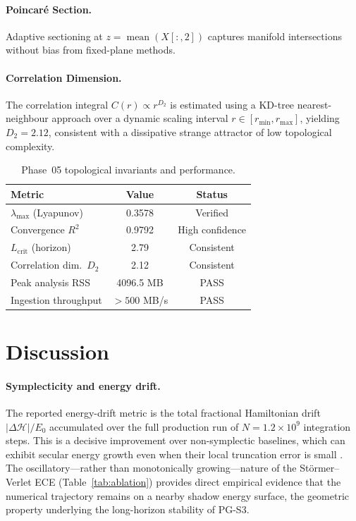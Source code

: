 \documentclass[10pt,twocolumn]{article}
\begin{document}
\paragraph{Poincar\'{e} Section.}
Adaptive sectioning at $z = \operatorname{mean}(X[:,2])$
captures manifold intersections without bias from
fixed-plane methods.

\paragraph{Correlation Dimension.}
The correlation integral $C(r)\propto r^{D_2}$ is estimated
using a KD-tree nearest-neighbour approach over a dynamic
scaling interval $r\in[r_{\min},r_{\max}]$,
yielding $D_2 = 2.12$, consistent with
a dissipative strange attractor of low topological complexity.

\begin{table}[h]
\centering
\caption{Phase~05 topological invariants and performance.}
\label{tab:phase05}
\small
\begin{tabular}{@{}lcc@{}}
\toprule
\textbf{Metric} & \textbf{Value} & \textbf{Status} \\
\midrule
$\lambda_{\max}$ (Lyapunov)    & 0.3578  & Verified \\
Convergence $R^2$              & 0.9792  & High confidence \\
$L_{\text{crit}}$ (horizon)    & 2.79    & Consistent \\
Correlation dim.\ $D_2$        & 2.12    & Consistent \\
Peak analysis RSS              & 4096.5 MB & PASS \\
Ingestion throughput           & $>500$ MB/s & PASS \\
\bottomrule
\end{tabular}
\end{table}

\section{Discussion}
\label{sec:discussion}

\paragraph{Symplecticity and energy drift.}
The reported energy-drift metric is the total fractional Hamiltonian drift
$|\Delta\mathcal{H}|/E_0$ accumulated over the full production run of
$N=1.2\times10^9$ integration steps.
This is a decisive improvement over non-symplectic baselines,
which can exhibit secular energy growth even when their local truncation
error is small \cite{hairer2006geometric}.
The oscillatory---rather than monotonically growing---nature of
the St\"{o}rmer--Verlet ECE (Table~\ref{tab:ablation}) provides
direct empirical evidence that the numerical trajectory remains on a nearby
shadow energy surface, the geometric property underlying the long-horizon
stability of PG-S3.
\end{document}
